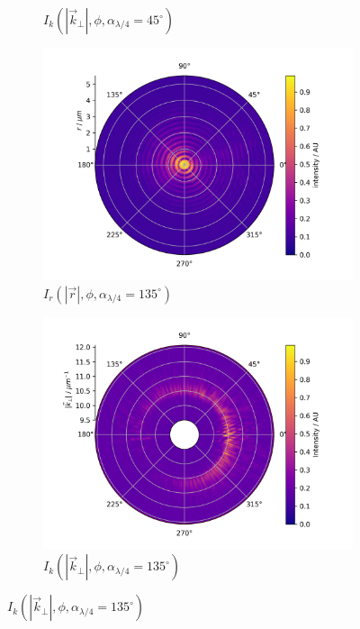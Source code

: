 \documentclass[titlepage,  ngerman]{article}
\begin{document}
\begin{figure}
\begin{subfigure}[b]{0.5\textwidth}
			\caption{$I_k(|\vec{k}_\perp|, \phi, \alpha_{\lambda /4}= 45^\circ)$}
			\label{fig:raw_bfp_45}
		\end{subfigure}		
		\hfill		
		\begin{subfigure}[b]{0.49\textwidth}
			\centering
			\includegraphics[width=\textwidth]{figures/fp/fp_135.png}
			\caption{$I_r(|\vec{r}|, \phi, \alpha_{\lambda /4} = 135^\circ)$}
			\label{fig:raw_fp_135}
		\end{subfigure}
		\begin{subfigure}[b]{0.5\textwidth}
			\centering
			\includegraphics[width=\textwidth]{figures/spin_hall/polar/polar_135.png}
			\caption{$I_k(|\vec{k}_\perp|, \phi, \alpha_{\lambda /4}= 135^\circ)$}
			\label{fig:raw_bfp_135}

\end{subfigure}
\end{figure}
\end{document}
